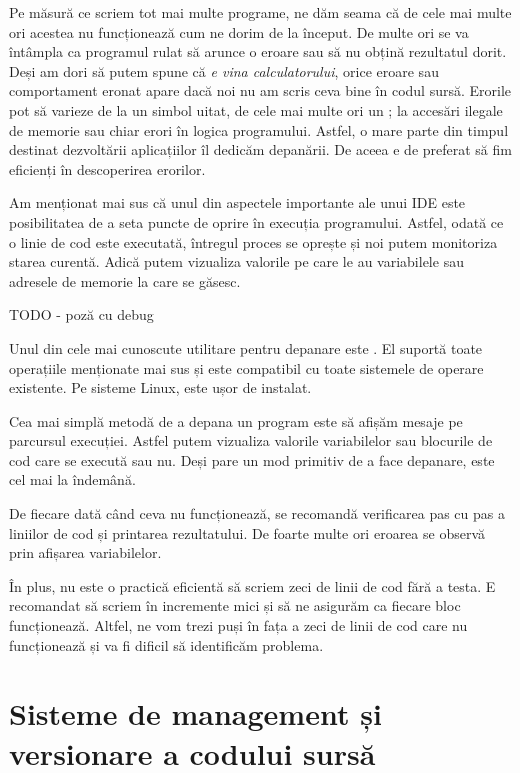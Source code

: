 Pe măsură ce scriem tot mai multe programe, ne dăm seama că de cele mai multe
ori acestea nu funcționează cum ne dorim de la început. De multe ori se va
întâmpla ca programul rulat să arunce o eroare sau să nu obțină rezultatul
dorit. Deși am dori să putem spune că \textit{e vina calculatorului}, orice
eroare sau comportament eronat apare dacă noi nu am scris ceva bine în codul
sursă. Erorile pot să varieze de la un simbol uitat, de cele mai multe ori un ;
la accesări ilegale de memorie sau chiar erori în logica programului. Astfel, o
mare parte din timpul destinat dezvoltării aplicațiilor îl dedicăm depanării. De
aceea e de preferat să fim eficienți în descoperirea erorilor.

Am menționat mai sus că unul din aspectele importante ale unui IDE este
posibilitatea de a seta puncte de oprire în execuția programului. Astfel, odată
ce o linie de cod este executată, întregul proces se oprește și noi putem
monitoriza starea curentă. Adică putem vizualiza valorile pe care le au
variabilele sau adresele de memorie la care se găsesc.

TODO - poză cu debug

Unul din cele mai cunoscute utilitare pentru depanare este . El suportă
toate operațiile menționate mai sus și este compatibil cu toate sistemele de
operare existente. Pe sisteme Linux, este ușor de instalat.

Cea mai simplă metodă de a depana un program este să afișăm mesaje pe parcursul
execuției. Astfel putem vizualiza valorile variabilelor sau blocurile de cod
care se execută sau nu. Deși pare un mod primitiv de a face depanare, este cel
mai la îndemână.

De fiecare dată când ceva nu funcționează, se recomandă verificarea pas cu pas a
liniilor de cod și printarea rezultatului. De foarte multe ori eroarea se
observă prin afișarea variabilelor.

În plus, nu este o practică eficientă să scriem zeci de linii de cod fără a
testa. E recomandat să scriem în incremente mici și să ne asigurăm ca fiecare
bloc funcționează. Altfel, ne vom trezi puși în fața a zeci de linii de cod care
nu funcționează și va fi dificil să identificăm problema.

\section{Sisteme de management și versionare a codului sursă}
\label{sec:appdev-versioning}

